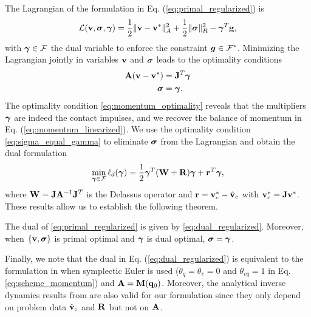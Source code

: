 The Lagrangian of the formulation in Eq. (\ref{eq:primal_regularized}) is
\begin{equation}
    \mathcal{L}({\mathbf{v}},{\bm\sigma},{\bm{\gamma}}) = 
\frac{1}{2}\Vert{\mathbf{v}}-{\mathbf{v}}^*\Vert_A^2 + \frac{1}{2} \Vert{\bm\sigma}\Vert_{R}^2 - {\bm{\gamma}}^T{\mathbf{g}},
\end{equation}
with ${\bm{\gamma}}\in\mathcal{F}$ the dual variable to enforce the constraint
${\bm{g}}\in \mathcal{F}^*$. Minimizing the Lagrangian jointly in variables ${\mathbf{v}}$ and ${\bm\sigma}$ leads
to the optimality conditions
\begin{subequations}\label{eq:primal_optimality_conditions}
\begin{align}
    \mf{A}(\mf{v}-\mf{v}^*) &= \mf{J}^T\vf{\gamma} \label{eq:momentum_optimality}\\
    \vf{\sigma} &= \vf{\gamma}.  \label{eq:sigma_equal_gamma}
\end{align}
\end{subequations}
The optimality condition \eqref{eq:momentum_optimality} reveals that the
multipliers ${\bm\gamma}$ are indeed the contact impulses, and we recover the
balance of momentum in Eq. (\ref{eq:momentum_linearized}). We use the optimality
condition \eqref{eq:sigma_equal_gamma} to eliminate ${\bm{\sigma}}$ from the
Lagrangian and obtain the dual formulation
\begin{align}
    \min_{\bgamma\in \mathcal{F}} \ell_d(\bgamma) =
    \frac{1}{2}\bgamma^T(\mathbf{W}+\mathbf{R})\bgamma + {\bm r}^T
    \bgamma,
	\label{eq:dual_regularized}
\end{align}
where ${\mathbf{W}}={\mathbf{J}}{\mathbf{A}}^{-1}{\mathbf{J}}^T$ is the Delassus operator and
${\mathbf{r}}={\mathbf{v}}_c^*-\hat{{\mathbf{v}}}_c$ with ${\mathbf{v}}_c^*={\mathbf{J}}{\mathbf{v}}^*$. These
results allow us to establish the following theorem.
\begin{theorem}\label{th:primal_dual} The dual of \eqref{eq:primal_regularized}
	is given by \eqref{eq:dual_regularized}. Moreover, when $\{{\mathbf{v}},{\bm\sigma}\}$ is
	primal optimal and ${\bm\gamma}$ is dual optimal, ${\bm\sigma} = {\bm\gamma}$.
\end{theorem}

Finally, we note that the dual in Eq. (\ref{eq:dual_regularized}) is equivalent
to the formulation in \cite{bib:todorov2011} when symplectic Euler is used
($\theta_{q} = \theta_v = 0$ and $\theta_{vq}=1$ in Eq.
\eqref{eq:scheme_momentum}) and ${\mathbf{A}}={\mathbf{M}}({\mathbf{q}}_0)$. Moreover, the
analytical inverse dynamics results from \cite{bib:todorov2011} are also valid
for our formulation since they only depend on problem data $\hat{{\mathbf{v}}}_c$ and
${\mathbf{R}}$ but not on ${\mathbf{A}}$.
